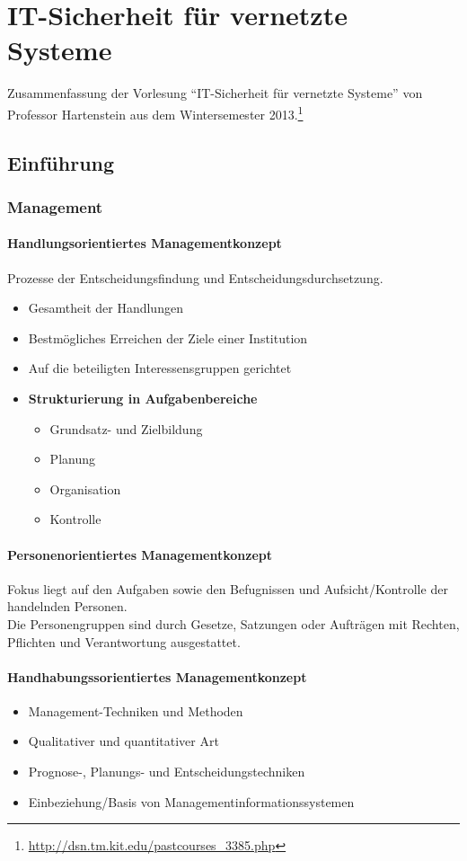 \chapter{IT-Sicherheit für vernetzte Systeme}
Zusammenfassung der Vorlesung  "`IT-Sicherheit für vernetzte Systeme"' von Professor Hartenstein aus dem Wintersemester 2013.\footnote{\url{http://dsn.tm.kit.edu/pastcourses_3385.php}}

\section{Einführung}

\subsection{Management}

\subsubsection{Handlungsorientiertes Managementkonzept}
Prozesse der Entscheidungsfindung und Entscheidungsdurchsetzung.
\begin{itemize}
	\item Gesamtheit der Handlungen
	\item Bestmögliches Erreichen der Ziele einer Institution
	\item Auf die beteiligten Interessensgruppen gerichtet
	\item \textbf{Strukturierung in Aufgabenbereiche}
	\begin{itemize}
		\item Grundsatz- und Zielbildung
		\item Planung
		\item Organisation
		\item Kontrolle
	\end{itemize}
\end{itemize}

\subsubsection{Personenorientiertes Managementkonzept}
Fokus liegt auf den Aufgaben sowie den Befugnissen und Aufsicht/Kontrolle der handelnden Personen.\\
Die Personengruppen sind durch Gesetze, Satzungen oder Aufträgen mit Rechten, Pflichten und Verantwortung ausgestattet.

\subsubsection{Handhabungssorientiertes Managementkonzept}
\begin{itemize}
	\item Management-Techniken und Methoden
	\item Qualitativer und quantitativer Art
	\item Prognose-, Planungs- und Entscheidungstechniken
	\item Einbeziehung/Basis von Managementinformationssystemen
\end{itemize}


